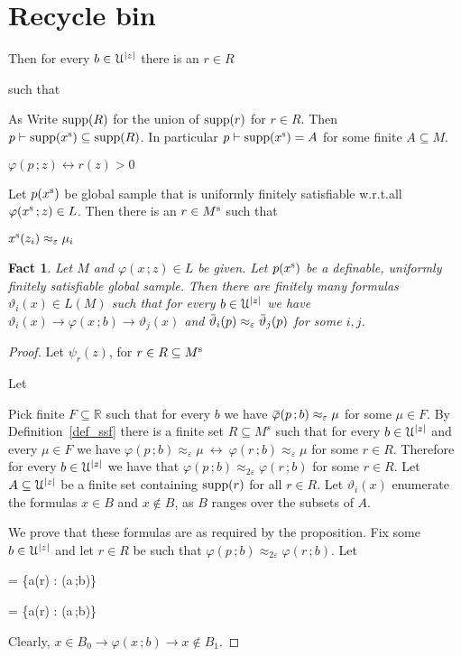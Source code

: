 \documentclass[10pt,openany]{article}
\def\proves{\vdash}
\def\proves{\vdash}
\def\RR{\mathds R}
\def\supp{\mathop{\rm supp}}
\newcommand{\sbar}[1]{\mkern 3mu\overline{\mkern-3mu#1\mkern-1mu}\mkern 1mu}
\newcommand{\barU}{\mkern 2mu\overline{\mkern-2mu\U\mkern-2mu}\mkern 2mu}
\newcommand{\barL}{\mkern 2.5mu\overline{\mkern-2.5mu L\mkern-3.5mu}\mkern 3.5mu}
\def\imp{\rightarrow}
\def\iff{\leftrightarrow}
\def\U{\EuScript U}
\def\theta{\vartheta}
\def\phi{\varphi}
\def\epsilon{\varepsilon}
\newcounter{thm}[section]
\theoremstyle{mio}
\newtheorem{fact}[thm]{Fact}
\theoremstyle{liscio}
\begin{document}
\section{Recycle bin}



%
Then for every $b\in\U^{|z|}$ there is an $r\in R$

\ceq{\hfill p(x^{\rm s})}{\proves}{x^{\rm s}(b)>0\iff r(b)>0} such that

As 
Write $\supp(R)$ for the union of $\supp(r)$ for $r\in R$.
%
Then $p\proves \supp(x^{\rm s}) \subseteq \supp(R)$.
%
In particular $p\proves \supp(x^{\rm s}) = A$ for some finite $A\subseteq M$.
%


$\phi(p\,;z) \iff r(z)>0$






Let $p(x^{\rm s})$ be global sample that is uniformly finitely satisfiable w.r.t.\@ all $\phi(x^{\rm s}\,;z)\in L$.
%
Then there is an $r\in M^{\rm s}$ such that 

$x^{\rm s}(z_i)\approx_\epsilon\mu_i$




\begin{fact}
  Let $M$ and $\phi(x\,;z)\in L$ be given.
  Let $p(x^{\rm s})$ be a definable, uniformly finitely satisfiable global sample.
  Then there are finitely many formulas $\theta_i(x)\in L(M)$ such that for every $b\in\U^{|z|}$ we have $\theta_i(x)\imp\phi(x\,;b)\imp\theta_j(x)$ and $\sbar\theta_i(p)\approx_\epsilon\sbar\theta_j(p)$ for some $i,j$.
\end{fact}

\begin{proof}
  Let $\psi_r(z)$, for $r\in R\subseteq M^{\rm s}$

  Let 


  Pick finite $F\subseteq\RR$ such that for every $b$ we have $\sbar\phi(p\,;b)\approx_{\epsilon}\mu$ for some $\mu\in F$.
  By Definition~\ref{def_ssf} there is a finite set $R\subseteq M^s$ such that for every $b\in\U^{|z|}$ and every $\mu\in F$ we have $\phi(p\,;b)\approx_{\epsilon}\mu\ \iff\ \phi(r\,;b)\approx_{\epsilon}\mu$ for some $r\in R$.
  Therefore for every $b\in\U^{|z|}$ we have that $\phi(p\,;b)\approx_{2\epsilon}\phi(r\,;b)$ for some $r\in R$.
  Let $A\subseteq\U^{|z|}$ be a finite set containing $\supp(r)$ for all $r\in R$. 
  Let $\theta_i(x)$ enumerate the formulas $x\in B$ and $x\notin B$, as $B$ ranges over the subsets of $A$.
  
  We prove that these formulas are as required by the proposition.
  Fix some $b\in\U^{|z|}$ and let $r\in R$ be such that $\phi(p\,;b)\approx_{2\epsilon}\phi(r\,;b)$.
  Let

  {=}
  {\{a\in\supp(r) : \phi(a\,;b)\}}
  
  {=}
  {\{a\in\supp(r) : \neg\phi(a\,;b)\}}

  Clearly, $x\in B_0\imp \phi(x\,;b)\imp x\notin B_1$.
\end{proof}
\end{document}
